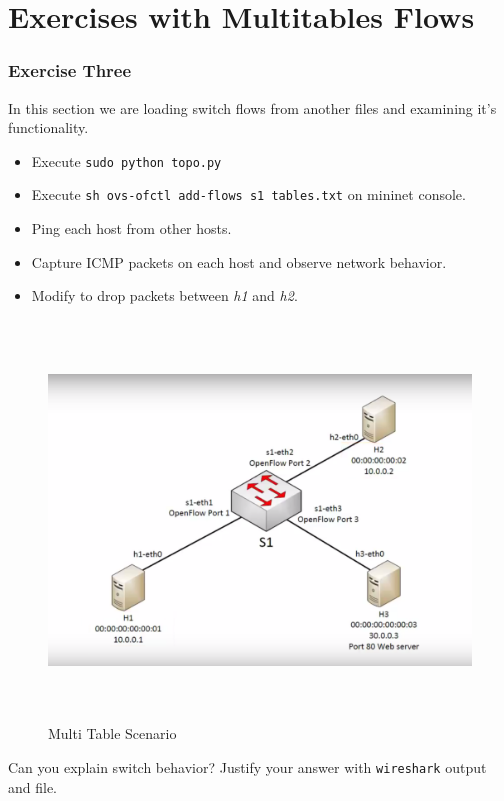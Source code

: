 \documentclass{../UTNetLab}
\begin{document}
\part{Exercises with Multitables Flows}
    \section{Exercise Three}
    In this section we are loading switch flows from another files and examining it's functionality.

    \begin{itemize}
        \item Execute \lstinline{sudo python topo.py} 
        \item Execute \lstinline{sh ovs-ofctl add-flows s1 tables.txt} on mininet console.
        \item Ping each host from other hosts.
        \item Capture ICMP packets on each host and observe network behavior.
        \item Modify  to drop packets between \textit{h1} and \textit{h2}.
    \end{itemize}

    \begin{figure}[H]
        \centering
        \includegraphics[height=300pt]{img/fig2.png}
        \caption{Multi Table Scenario}
        \label{fig:MultiTableScenario}
    \end{figure}


    \begin{report}
        \item Can you explain switch behavior? Justify your answer with \lstinline{wireshark} output and  file.
    \end{report}
\end{document}
